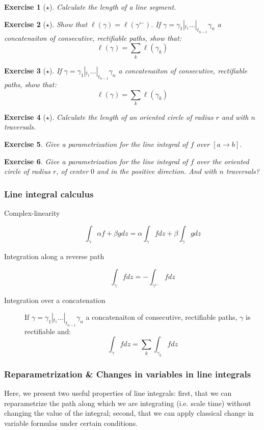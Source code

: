 \documentclass{article}
\newtheorem{exo}{Exercise}
\begin{document}
\begin{exo}[$\star$]
    Calculate the length of a line segment. 
\end{exo}
\begin{exo}[$\star$]
    Show that $\ell(\gamma) = \ell(\gamma^{\leftarrow})$.
    If $\gamma = \gamma_1 |_{t_1} \dots |_{t_{n-1}} \gamma_n$ a concatenaiton of consecutive, rectifiable paths, show that:
    $$ \ell(\gamma) = \sum_k{\ell(\gamma_k)}$$
\end{exo}
\begin{exo}[$\star$]
    If $\gamma = \gamma_1 |_{t_1} \dots |_{t_{n-1}} \gamma_n$ a concatenaiton of consecutive, rectifiable paths, show that:
    $$ \ell(\gamma) = \sum_k{\ell(\gamma_k)}$$
\end{exo}
\begin{exo}[$\star$]
    Calculate the length of an oriented circle of radius $r$ and with $n$ traversals.
\end{exo}
\begin{exo}
    Give a parametrization for the line integral of $f$ over $[a \rightarrow b]$.
\end{exo}
\begin{exo}
    Give a parametrization for the line integral of $f$ over the oriented circle of radius $r$, of center $0$ and in the positive direction. And with $n$ traversals?
\end{exo}


\subsubsection{Line integral calculus}
\begin{description}
    \item[Complex-linearity] $$\int_\gamma \alpha f + \beta g dz = \alpha \int_\gamma fdz + \beta \int_\gamma gdz$$
    \item[Integration along a reverse path] $$\int_\gamma fdz = - \int_{\gamma^{\leftarrow}}fdz$$
    \item[Integration over a concatenation] If $\gamma = \gamma_1 |_{t_1} \dots |_{t_{n-1}} \gamma_n$ a concatenaiton of consecutive, rectifiable paths, $\gamma$ is rectifiable and:
        $$\int_\gamma fdz = \sum_k \int_{\gamma_k}fdz$$
\end{description}

\subsubsection{Reparametrization \& Changes in variables in line integrals}
Here, we present two useful properties of line integrals: first, that we can reparametrize the path along which we are integrating (i.e. scale time) without changing the value of the integral; second, that we can apply classical change in variable formulas under certain conditions.
\end{document}
